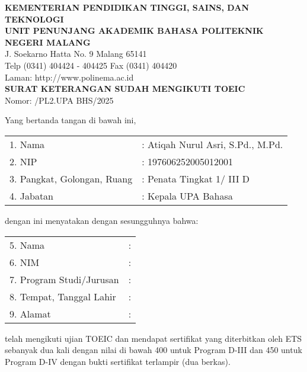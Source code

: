 \documentclass[a4paper,12pt]{article}
\begin{document}
\begin{center}
\textbf{KEMENTERIAN PENDIDIKAN TINGGI, SAINS, DAN TEKNOLOGI} \\
\textbf{UNIT PENUNJANG AKADEMIK BAHASA POLITEKNIK NEGERI MALANG} \\
J. Soekarno Hatta No. 9 Malang 65141 \\
Telp (0341) 404424 - 404425 Fax (0341) 404420 \\
Laman: http://www.polinema.ac.id \\
\vspace{1cm}
\textbf{SURAT KETERANGAN SUDAH MENGIKUTI TOEIC} \\
Nomor: \underline{\hspace{3cm}}/PL2.UPA BHS/\underline{\hspace{2cm}}2025
\end{center}

\vspace{0.5cm}

Yang bertanda tangan di bawah ini,

\begin{tabular}{l l}
1. Nama                & : Atiqah Nurul Asri, S.Pd., M.Pd. \\
2. NIP                 & : 197606252005012001 \\
3. Pangkat, Golongan, Ruang & : Penata Tingkat 1/ III D \\
4. Jabatan             & : Kepala UPA Bahasa \\
\end{tabular}

dengan ini menyatakan dengan sesungguhnya bahwa:

\begin{tabular}{l l}
5. Nama                & : \underline{\hspace{3cm}} \\
6. NIM                 & : \underline{\hspace{3cm}} \\
7. Program Studi/Jurusan & : \underline{\hspace{3cm}} \\
8. Tempat, Tanggal Lahir & : \underline{\hspace{3cm}} \\
9. Alamat              & : \underline{\hspace{3cm}} \\
\end{tabular}

telah mengikuti ujian TOEIC dan mendapat sertifikat yang diterbitkan oleh ETS sebanyak dua kali dengan nilai di bawah 400 untuk Program D-III dan 450 untuk Program D-IV dengan bukti sertifikat terlampir (dua berkas).
\end{document}
